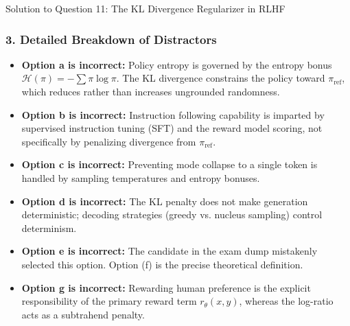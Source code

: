 \documentclass[11pt,a4paper]{article}
\begin{document}
\begin{solutionbox}{Solution to Question 11: The KL Divergence Regularizer in RLHF}
\subsubsection*{3. Detailed Breakdown of Distractors}
\begin{itemize}[leftmargin=1.5em]
    \item \textbf{Option a is incorrect:} Policy entropy is governed by the entropy bonus $\mathcal{H}(\pi) = -\sum \pi \log \pi$. The KL divergence constrains the policy toward $\pi_{\text{ref}}$, which reduces rather than increases ungrounded randomness.
    \item \textbf{Option b is incorrect:} Instruction following capability is imparted by supervised instruction tuning (SFT) and the reward model scoring, not specifically by penalizing divergence from $\pi_{\text{ref}}$.
    \item \textbf{Option c is incorrect:} Preventing mode collapse to a single token is handled by sampling temperatures and entropy bonuses.
    \item \textbf{Option d is incorrect:} The KL penalty does not make generation deterministic; decoding strategies (greedy vs. nucleus sampling) control determinism.
    \item \textbf{Option e is incorrect:} The candidate in the exam dump mistakenly selected this option. Option (f) is the precise theoretical definition.
    \item \textbf{Option g is incorrect:} Rewarding human preference is the explicit responsibility of the primary reward term $r_\theta(x, y)$, whereas the log-ratio acts as a subtrahend penalty.
\end{itemize}
\end{solutionbox}
\end{document}
